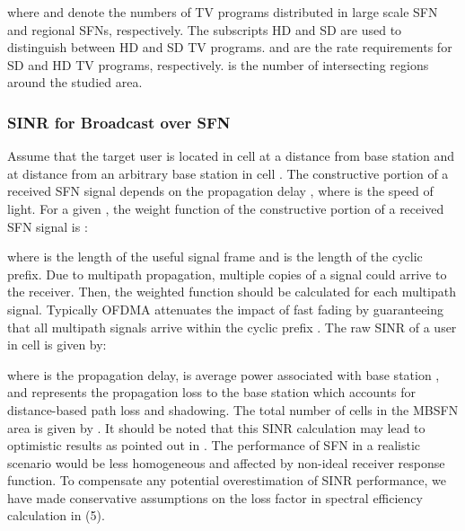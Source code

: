 \documentclass[journal]{IEEEtran}
\begin{document}
where  and  denote the numbers of TV programs distributed in large scale SFN and regional SFNs, respectively. The subscripts HD and SD are used to distinguish between HD and SD TV programs.  and  are the rate requirements for SD and HD TV programs, respectively.  is the number of intersecting regions around the studied area.

\subsubsection{\textbf{SINR for Broadcast over SFN}}
Assume that the target user is located in cell  at a distance  from base station  and at distance  from an arbitrary base station  in cell . The constructive portion of a received SFN signal depends on the propagation delay , where  is the speed of light. For a given , the weight function of the constructive portion of a received SFN signal is \cite{Mogensen}\cite{jens}:

where  is the length of the useful signal frame and  is the length of the cyclic prefix. Due to multipath propagation, multiple copies of a signal could arrive to the receiver. Then, the weighted function should be calculated for each multipath signal. Typically OFDMA attenuates the impact of fast fading by guaranteeing that all multipath signals arrive within the cyclic prefix \cite{Rong11}. The raw SINR of a user in cell  is given by:

where  is the propagation delay,  is average power associated with base station , and  represents the propagation loss to the base station  which accounts for distance-based path loss and shadowing. The total number of cells in the MBSFN area is given by .
It should be noted that this SINR calculation may lead to optimistic results as pointed out in \cite{Plets10} \cite{Plets11}. The performance of SFN in a realistic scenario would be less homogeneous and affected by non-ideal receiver response function. To compensate any potential overestimation of SINR performance, we have made conservative assumptions on the loss factor in spectral efficiency calculation in (5).
\end{document}
